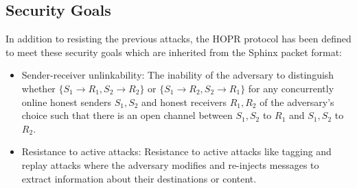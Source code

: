 \subsection*{Security Goals}
In addition to resisting the previous attacks, the HOPR protocol has been defined to meet these security goals which are inherited from the Sphinx packet format:
\begin{itemize}
    \item Sender-receiver unlinkability: The inability of the adversary to distinguish whether $\{S_1\rightarrow R_1, S_2\rightarrow R_2\}$ or $\{S_1\rightarrow R_2, S_2\rightarrow R_1\}$ for any concurrently online honest senders $S_1,S_2$ and honest receivers $R_1,R_2$ of the adversary’s choice such that there is an open channel between $S_1,S_2$ to $R_1$ and $S_1,S_2$ to $R_2$.
    \item Resistance to active attacks: Resistance to active attacks like tagging and replay attacks where the adversary modifies and re-injects messages to extract information about their destinations or content.
    
\end{itemize}




